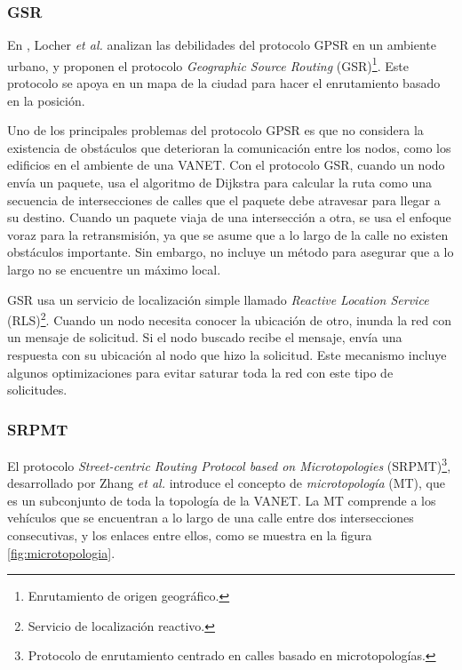 \subsubsection{GSR}

\label{subsubsec:gsr}

En \cite{Lochert2003}, Locher \textit{et al.} analizan las debilidades del
protocolo GPSR en un ambiente urbano, y proponen el protocolo
\textit{Geographic Source Routing} (GSR)\footnote{Enrutamiento de origen
geográfico.}. Este protocolo se apoya en un mapa de la ciudad para hacer el
enrutamiento basado en la posición.

Uno de los principales problemas del protocolo GPSR es que no considera la
existencia de obstáculos que deterioran la comunicación entre los nodos, como
los edificios en el ambiente de una VANET. Con el protocolo GSR, cuando un nodo
envía un paquete, usa el algoritmo de Dijkstra para calcular la ruta como una
secuencia de intersecciones de calles que el paquete debe atravesar para llegar
a su destino. Cuando un paquete viaja de una intersección a otra, se usa el
enfoque voraz para la retransmisión, ya que se asume que a lo largo de la calle
no existen obstáculos importante. Sin embargo, no incluye un método para
asegurar que a lo largo no se encuentre un máximo local.

GSR usa un servicio de localización simple llamado \textit{Reactive Location
Service} (RLS)\footnote{Servicio de localización reactivo.}. Cuando un nodo
necesita conocer la ubicación de otro, inunda la red con un mensaje de
solicitud. Si el nodo buscado recibe el mensaje, envía una respuesta con su
ubicación al nodo que hizo la solicitud. Este mecanismo incluye algunos
optimizaciones para evitar saturar toda la red con este tipo de solicitudes.

\subsubsection{SRPMT}

\label{subsubsec:srpmt}

El protocolo \textit{Street-centric Routing Protocol based on Microtopologies}
(SRPMT)\footnote{Protocolo de enrutamiento centrado en calles basado en
microtopologías.}, desarrollado por Zhang \textit{et al.} \cite{Zhang2016}
introduce el concepto de \textit{microtopología} (MT), que es un subconjunto de
toda la topología de la VANET. La MT comprende a los vehículos que se encuentran
a lo largo de una calle entre dos intersecciones consecutivas, y los enlaces
entre ellos, como se muestra en la figura \ref{fig:microtopologia}.

